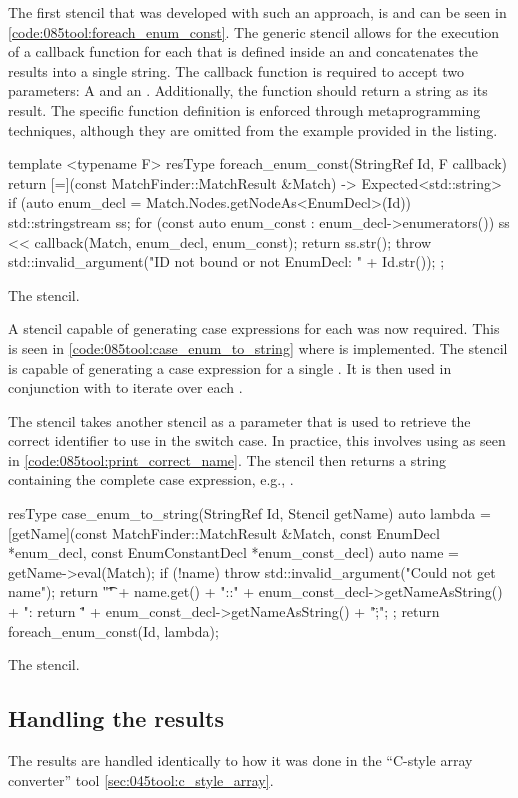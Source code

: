 The first stencil that was developed with such an approach, is  and can be seen in \cref{code:085tool:foreach_enum_const}.
The generic stencil allows for the execution of a callback function for each  that is defined inside an  and concatenates the results into a single string.
The callback function is required to accept two parameters: A  and an . Additionally, the function should return a string as its result.
The specific function definition is enforced through metaprogramming techniques, although they are omitted from the example provided in the listing.

\begin{listing}[H]
    \begin{cppcode}
template <typename F>
resType foreach_enum_const(StringRef Id, F callback) {
	return [=](const MatchFinder::MatchResult &Match) -> Expected<std::string> {
		if (auto enum_decl = Match.Nodes.getNodeAs<EnumDecl>(Id)) {
			std::stringstream ss;
			for (const auto enum_const : enum_decl->enumerators()) {
				ss << callback(Match, enum_decl, enum_const);
			}
			return ss.str();
		}
		throw std::invalid_argument("ID not bound or not EnumDecl: " + Id.str());
	};
}
    \end{cppcode}
    \caption{The  stencil.}
    \label{code:085tool:foreach_enum_const}
\end{listing}

A stencil capable of generating case expressions for each  was now required. This is seen in \cref{code:085tool:case_enum_to_string} where  is implemented.
The stencil is capable of generating a case expression for a single . It is then used in conjunction with  to iterate over each .

The stencil takes another stencil as a parameter that is used to retrieve the correct identifier to use in the switch case. In practice, this involves using  as seen in \cref{code:085tool:print_correct_name}.
The stencil then returns a string containing the complete case expression, e.g., .

\begin{listing}[H]
    \begin{cppcode}
resType case_enum_to_string(StringRef Id, Stencil getName) {
	auto lambda = [getName](const MatchFinder::MatchResult &Match, const EnumDecl *enum_decl,
					   const EnumConstantDecl *enum_const_decl) {
			auto name = getName->eval(Match);
			if (!name) {
				throw std::invalid_argument("Could not get name");
			}
			return "\t\tcase " + name.get() +
				   "::" + enum_const_decl->getNameAsString() + ": return \"" +
				   enum_const_decl->getNameAsString() + "\";\n";
		};
	return foreach_enum_const(Id, lambda);
}
    \end{cppcode}
    \caption{The  stencil.}
    \label{code:085tool:case_enum_to_string}
\end{listing}

\subsection{Handling the results}
The results are handled identically to how it was done in the ``C-style array converter'' tool \cref{sec:045tool:c_style_array}.